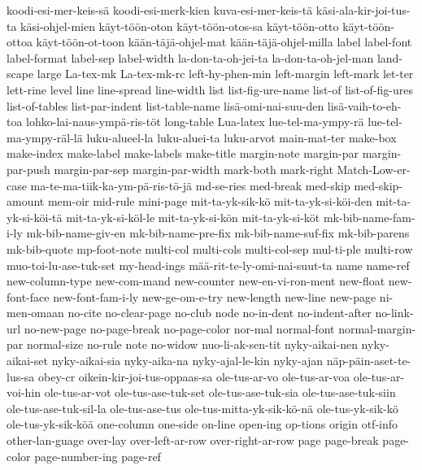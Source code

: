 {  koodi-esi-mer-keis-sä
  koodi-esi-merk-kien
  kuva-esi-mer-keis-tä
  käsi-ala-kir-joi-tus-ta
  käsi-ohjel-mien
  käyt-töön-oton
  käyt-töön-otos-sa
  käyt-töön-otto
  käyt-töön-ottoa
  käyt-töön-ot-toon
  kään-täjä-ohjel-mat
  kään-täjä-ohjel-milla
  label
  label-font
  label-format
  label-sep
  label-width
  la-don-ta-oh-jei-ta
  la-don-ta-oh-jel-man
  land-scape
  large
  La-tex-mk
  La-tex-mk-rc
  left-hy-phen-min
  left-margin
  left-mark
  let-ter
  lett-rine
  level
  line
  line-spread
  line-width
  list
  list-fig-ure-name
  list-of
  list-of-fig-ures
  list-of-tables
  list-par-indent
  list-table-name
  lisä-omi-nai-suu-den
  lisä-vaih-to-eh-toa
  lohko-lai-naus-ympä-ris-töt
  long-table
  Lua-latex
  lue-tel-ma-ympy-rä
  lue-tel-ma-ympy-räl-lä
  luku-alueel-la
  luku-aluei-ta
  luku-arvot
  main-mat-ter
  make-box
  make-index
  make-label
  make-labels
  make-title
  margin-note
  margin-par
  margin-par-push
  margin-par-sep
  margin-par-width
  mark-both
  mark-right
  Match-Low-er-case
  ma-te-ma-tiik-ka-ym-pä-ris-tö-jä
  md-se-ries
  med-break
  med-skip
  med-skip-amount
  mem-oir
  mid-rule
  mini-page
  mit-ta-yk-sik-kö
  mit-ta-yk-si-köi-den
  mit-ta-yk-si-köi-tä
  mit-ta-yk-si-köl-le
  mit-ta-yk-si-kön
  mit-ta-yk-si-köt
  mk-bib-name-fam-i-ly
  mk-bib-name-giv-en
  mk-bib-name-pre-fix
  mk-bib-name-suf-fix
  mk-bib-parens
  mk-bib-quote
  mp-foot-note
  multi-col
  multi-cols
  multi-col-sep
  mul-ti-ple
  multi-row
  muo-toi-lu-ase-tuk-set
  my-head-ings
  mää-rit-te-ly-omi-nai-suut-ta
  name
  name-ref
  new-column-type
  new-com-mand
  new-counter
  new-en-vi-ron-ment
  new-float
  new-font-face
  new-font-fam-i-ly
  new-ge-om-e-try
  new-length
  new-line
  new-page
  ni-men-omaan
  no-cite
  no-clear-page
  no-club
  node
  no-in-dent
  no-indent-after
  no-link-url
  no-new-page
  no-page-break
  no-page-color
  nor-mal
  normal-font
  normal-margin-par
  normal-size
  no-rule
  note
  no-widow
  nuo-li-ak-sen-tit
  nyky-aikai-nen
  nyky-aikai-set
  nyky-aikai-sia
  nyky-aika-na
  nyky-ajal-le-kin
  nyky-ajan
  näp-päin-aset-te-lus-sa
  obey-cr
  oikein-kir-joi-tus-oppaas-sa
  ole-tus-ar-vo
  ole-tus-ar-voa
  ole-tus-ar-voi-hin
  ole-tus-ar-vot
  ole-tus-ase-tuk-set
  ole-tus-ase-tuk-sia
  ole-tus-ase-tuk-siin
  ole-tus-ase-tuk-sil-la
  ole-tus-ase-tus
  ole-tus-mitta-yk-sik-kö-nä
  ole-tus-yk-sik-kö
  ole-tus-yk-sik-köä
  one-column
  one-side
  on-line
  open-ing
  op-tions
  origin
  otf-info
  other-lan-guage
  over-lay
  over-left-ar-row
  over-right-ar-row
  page
  page-break
  page-color
  page-number-ing
  page-ref
}
